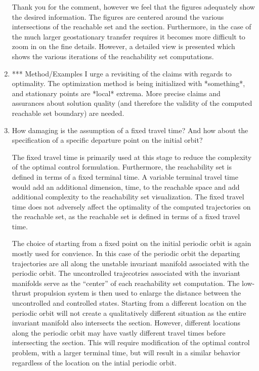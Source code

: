 \documentclass[11pt]{article}
\begin{document}
\begin{enumerate}
Thank you for the comment, however we feel that the figures adequately show the desired information.
The figures are centered around the various intersections of the reachable set and the \Poincare section.
Furthermore, in the case of the much larger geostationary transfer requires it becomes more difficult to zoom in on the fine details.
However, a detailed view is presented which shows the various iterations of the reachability set computations.

\item
    {\color{red}
    \begin{itshape}
*** Method/Examples
I urge a revisiting of the claims with regards to optimality.  The optimization method is being initialized with *something*, and stationary points are *local* extrema.  More precise claims and assurances about solution quality (and therefore the validity of the computed reachable set boundary) are needed.  
\end{itshape}
}


\item
    \begin{itshape}
How damaging is the assumption of a fixed travel time?  And how about the specification of a specific departure point on the initial orbit?
\end{itshape}

The fixed travel time is primarily used at this stage to reduce the complexity of the optimal control formulation. 
Furthermore, the reachability set is defined in terms of a fixed terminal time.
A variable terminal travel time would add an additional dimension, time, to the reachable space and add additional complexity to the reachability set visualization.
The fixed travel time does not adversely affect the optimality of the computed trajectories on the reachable set, as the reachable set is defined in terms of a fixed travel time. 

The choice of starting from a fixed point on the initial periodic orbit is again mostly used for convience. 
In this case of the periodic orbit the departing trajectories are all along the unstable invariant manifold associated with the periodic orbit. 
The uncontrolled trajecotries associated with the invariant manifolds serve as the ``center'' of each reachability set computation.
The low-thrust propulsion system is then used to enlarge the distance between the uncontrolled and controlled states. 
Starting from a different location on the periodic orbit will not create a qualitatively different situation as the entire invariant manifold also intersects the \Poincare section.
However, different locations along the periodic orbit may have vastly different travel times before intersecting the \Poincare section.
This will require modification of the optimal control problem, with a larger terminal time, but will result in a similar behavior regardless of the location on the intial periodic orbit.


\end{enumerate}
\end{document}
